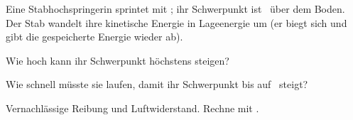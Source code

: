 Eine Stabhochspringerin sprintet mit \vAO; ihr Schwerpunkt ist \hAO\ über dem Boden. Der Stab wandelt ihre kinetische Energie in Lageenergie um (er biegt sich und gibt die gespeicherte Energie wieder ab).

\begin{abcliste}
\abc
Wie hoch kann ihr Schwerpunkt höchstens steigen?

\abc
Wie schnell müsste sie laufen, damit ihr Schwerpunkt bis auf \hZO\ steigt?
\end{abcliste}

Vernachlässige Reibung und Luftwiderstand. Rechne mit \gO.
